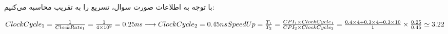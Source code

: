 با توجه به اطلاعات صورت سوال، تسریع را به تقریب محاسبه می‌کنیم:

\setLTR
$
ClockCycle_1 = \frac{1}{ClockRate_1} = \frac{1}{4\times10^9} = 0.25{ns} \longrightarrow ClockCycle_2 = 0.45ns \\  \\
SpeedUp = \frac{T_1}{T_2} = \frac{CPI_1 \times ClockCycle_1}{CPI_2 \times ClockCycle_2} = \frac{0.4\times4 + 0.3\times4+0.3\times10}{1} \times \frac{0.25}{0.45} \simeq 3.22
$
\setRTL
